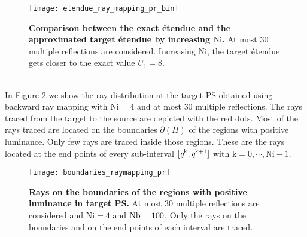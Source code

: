 \begin{figure}[t]
  \begin{center}
  \texttt{[image: etendue\_ray\_mapping\_pr\_bin]}
  \end{center}
  \caption{\textbf{Comparison between the exact \'{e}tendue and the approximated target \'{e}tendue by increasing $\textrm{Ni}$.}
 At most $30$ multiple reflections are considered. Increasing $\textrm{Ni}$, the target \'{e}tendue gets closer to the exact value $U_1=8$.}
\label{fig:etendue_ray_mapping_pr_bin}
 \end{figure}
\\ \indent In Figure \ref{fig:boundaries_rays_pr_raymapping} we show the ray distribution at the target PS obtained using backward ray mapping with $\textrm{Ni}=4$ and at most $30$ multiple reflections. The rays traced from the target to the source are depicted with the red dots. Most of the rays traced are located on the boundaries $\partial$$(\Pi)$ of the regions with positive luminance. 
Only few rays are traced inside those regions. These are the rays located at the end points of every sub-interval $[\textit{q}^{\textrm{k}}, \textit{q}^{\textrm{k}+1}]$ with $\textrm{k}=0, \cdots, \textrm{Ni}-1$. 
\begin{figure}[h]
  \begin{center}
  \texttt{[image: boundaries\_raymapping\_pr]}
  \end{center}
  \caption{\textbf{Rays on the boundaries of the regions with positive luminance in target PS.}
 At most $30$ multiple reflections are considered and $\textrm{Ni}=4$ and $\textrm{Nb} = 100$. Only the rays on the boundaries and on the end points of each interval are traced.}
\label{fig:boundaries_rays_pr_raymapping}
 \end{figure}
\\ \indent
